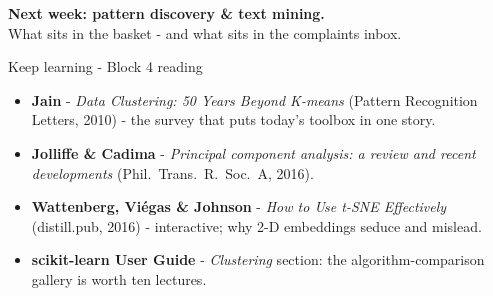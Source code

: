 \documentclass[10pt,aspectratio=169]{beamer}
\begin{document}
\begin{frame}[plain]
  \begin{center}
    \vspace{1.5cm}
    {\LARGE\textbf{Next week: pattern discovery \& text mining.}}\\[0.6cm]
    {\normalsize What sits in the basket - and what sits in the
    complaints inbox.}
  \end{center}
\end{frame}

\begin{frame}{Keep learning - Block 4 reading}
  \begin{itemize}
    \item \textbf{Jain} - \emph{Data Clustering: 50 Years Beyond K-means}
          (Pattern Recognition Letters, 2010) - the survey that puts
          today's toolbox in one story.
    \item \textbf{Jolliffe \& Cadima} - \emph{Principal component analysis:
          a review and recent developments} (Phil.\ Trans.\ R.\ Soc.\ A, 2016).
    \item \textbf{Wattenberg, Vi\'egas \& Johnson} - \emph{How to Use t-SNE
          Effectively} (distill.pub, 2016) - interactive; why 2-D embeddings
          seduce and mislead.
    \item \textbf{scikit-learn User Guide} - \emph{Clustering} section:
          the algorithm-comparison gallery is worth ten lectures.
  \end{itemize}
\end{frame}
\end{document}
